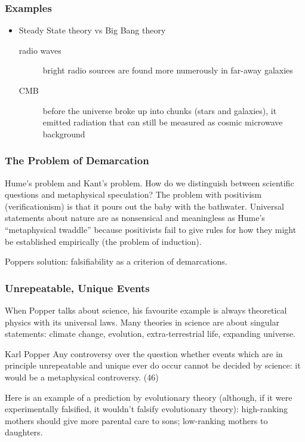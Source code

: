 \documentclass[xcolor=dvipsnames]{beamer}
\begin{document}
\begin{frame}
  \frametitle{Examples}
  \begin{itemize}
  \item Steady State theory vs Big Bang theory
    \begin{description}
    \item[radio waves] bright radio sources are found more numerously
      in far-away galaxies
    \item[CMB] before the universe broke up into chunks (stars and
      galaxies), it emitted radiation that can still be measured as
      cosmic microwave background
    \end{description}
  \end{itemize}
\end{frame}

\begin{frame}
  \frametitle{The Problem of Demarcation}
Hume's problem and Kant's problem. How do we distinguish between
scientific questions and metaphysical speculation? The problem with
positivism (verificationism) is that it pours out the baby with the
bathwater. Universal statements about nature are as nonsensical and
meaningless as Hume's ``metaphysical twaddle'' because positivists
fail to give rules for how they might be established empirically
(the problem of induction).

\bigskip 

Poppers solution: \alert{falsifiability} as a criterion of
demarcations. 
\end{frame}

\begin{frame}
  \frametitle{Unrepeatable, Unique Events}
  When Popper talks about science, his favourite example is always
  theoretical physics with its universal laws. Many theories in
  science are about singular statements: climate change, evolution,
  extra-terrestrial life, expanding universe.
  \begin{block}{Karl Popper}
    Any controversy over the question whether events which are in
    principle unrepeatable and unique ever do occur cannot be decided
    by science: it would be a metaphysical controversy. (46)
  \end{block}
Here is an example of a prediction by evolutionary theory (although,
if it were experimentally falsified, it wouldn't falsify evolutionary
theory): high-ranking mothers should give more parental care to sons;
low-ranking mothers to daughters. 
\end{frame}
\end{document}
